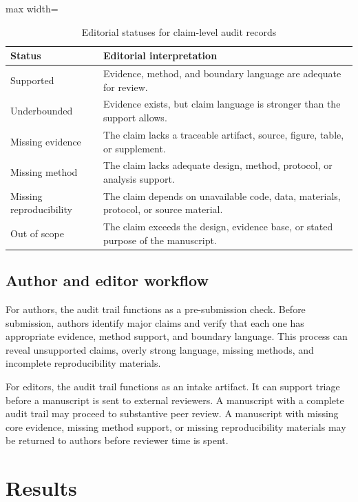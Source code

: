 \documentclass[12pt]{article}
\begin{document}
\begin{table}[htbp]
\centering
\caption{Editorial statuses for claim-level audit records}
\begin{adjustbox}{max width=\textwidth}
\begin{tabularx}{\textwidth}{p{}X}
\toprule
\textbf{Status} & \textbf{Editorial interpretation} \\
\midrule
Supported & Evidence, method, and boundary language are adequate for review. \\
Underbounded & Evidence exists, but claim language is stronger than the support allows. \\
Missing evidence & The claim lacks a traceable artifact, source, figure, table, or supplement. \\
Missing method & The claim lacks adequate design, method, protocol, or analysis support. \\
Missing reproducibility & The claim depends on unavailable code, data, materials, protocol, or source material. \\
Out of scope & The claim exceeds the design, evidence base, or stated purpose of the manuscript. \\
\bottomrule
\end{tabularx}
\end{adjustbox}
\end{table}

\subsection{Author and editor workflow}

For authors, the audit trail functions as a pre-submission check. Before submission, authors identify major claims and verify that each one has appropriate evidence, method support, and boundary language. This process can reveal unsupported claims, overly strong language, missing methods, and incomplete reproducibility materials.

For editors, the audit trail functions as an intake artifact. It can support triage before a manuscript is sent to external reviewers. A manuscript with a complete audit trail may proceed to substantive peer review. A manuscript with missing core evidence, missing method support, or missing reproducibility materials may be returned to authors before reviewer time is spent.

\section{Results}
\end{document}
